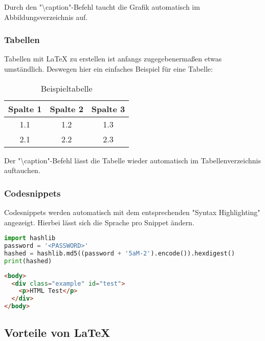 Durch den "\textbackslash{}caption"-Befehl taucht die Grafik automatisch im Abbildungsverzeichnis auf.

\subsubsection{Tabellen}

Tabellen mit \LaTeX{} zu erstellen ist anfangs zugegebenermaßen etwas umständlich. Deswegen hier ein einfaches
Beispiel für eine Tabelle:


\begin{table}[H]
  \centering
  \begin{tabular}{|c|c|c|}
    \hline
    Spalte 1 & Spalte 2 & Spalte 3 \\
    \hline
    1.1 & 1.2 & 1.3 \\
    2.1 & 2.2 & 2.3 \\
    \hline
  \end{tabular}
  \caption{Beispieltabelle}
  \label{tab: Beispieltabelle}
\end{table}

Der "\textbackslash{}caption"-Befehl lässt die Tabelle wieder automatisch im Tabellenverzeichnis auftauchen.

\subsubsection{Codesnippets}

Codesnippets werden automatisch mit dem entsprechenden "Syntax Highlighting" angezeigt.
Hierbei lässt sich die Sprache pro Snippet ändern.
\vspace{.5cm}

\begin{lstlisting}[language=Python,caption=MD5-Hash-Generierung in Python]
import hashlib
password = '<PASSWORD>'
hashed = hashlib.md5((password + '5aM-2').encode()).hexdigest()
print(hashed)
\end{lstlisting}

\begin{lstlisting}[language=HTML,caption=HTML-Beispiel]
<body>
  <div class="example" id="test">
    <p>HTML Test</p>
  </div>
</body>
\end{lstlisting}

\subsection{Vorteile von \LaTeX}

